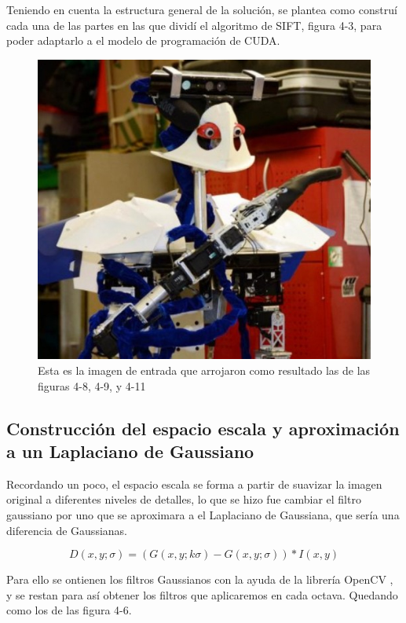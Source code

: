 Teniendo en cuenta la estructura general de la solución, se plantea como construí cada una de las partes en las que dividí el algoritmo de SIFT, figura 4-3,  para poder adaptarlo a el modelo de programación de CUDA.

\begin{figure}[t]
		\centering
		\includegraphics[scale=0.4]{img/justina.jpg}
		\caption{Esta es la imagen de entrada que arrojaron como resultado las de las figuras 4-8, 4-9, y 4-11}
\end{figure}


\subsection{Construcción del espacio escala y aproximación a un Laplaciano de Gaussiano}

Recordando un poco, el espacio escala se forma a partir de suavizar la imagen original a diferentes niveles de detalles, lo que se hizo fue cambiar el filtro gaussiano por uno que se aproximara a el Laplaciano de Gaussiana, que sería una diferencia de Gaussianas. 

$$D(x,y;\sigma) = (G(x,y;k\sigma) - G(x,y;\sigma)) * I(x,y)$$ 

Para ello se ontienen los filtros Gaussianos con la ayuda de la librería OpenCV \cite{Opencv}, y se restan para así obtener los filtros que aplicaremos en cada octava. Quedando como los de las figura 4-6.



